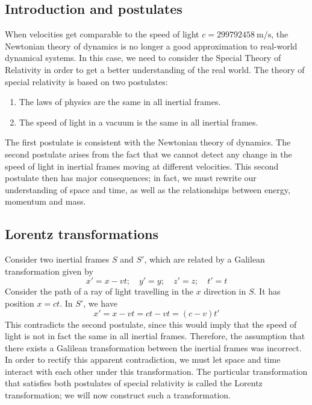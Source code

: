 \subsection{Introduction and postulates}
When velocities get comparable to the speed of light \(c = \SI{299792458}{\metre\per\second}\), the Newtonian theory of dynamics is no longer a good approximation to real-world dynamical systems.
In this case, we need to consider the Special Theory of Relativity in order to get a better understanding of the real world.
The theory of special relativity is based on two postulates:
\begin{enumerate}
	\item The laws of physics are the same in all inertial frames.
	\item The speed of light in a vacuum is the same in all inertial frames.
\end{enumerate}
The first postulate is consistent with the Newtonian theory of dynamics.
The second postulate arises from the fact that we cannot detect any change in the speed of light in inertial frames moving at different velocities.
This second postulate then has major consequences; in fact, we must rewrite our understanding of space and time, as well as the relationships between energy, momentum and mass.

\subsection{Lorentz transformations}
Consider two inertial frames \(S\) and \(S'\), which are related by a Galilean transformation given by
\[
	x' = x - vt;\quad y' = y;\quad z' = z;\quad t' = t
\]
Consider the path of a ray of light travelling in the \(x\) direction in \(S\).
It has position \(x = ct\).
In \(S'\), we have
\[
	x' = x - vt = ct - vt = (c-v)t'
\]
This contradicts the second postulate, since this would imply that the speed of light is not in fact the same in all inertial frames.
Therefore, the assumption that there exists a Galilean transformation between the inertial frames was incorrect.
In order to rectify this apparent contradiction, we must let space and time interact with each other under this transformation.
The particular transformation that satisfies both postulates of special relativity is called the Lorentz transformation; we will now construct such a transformation.

